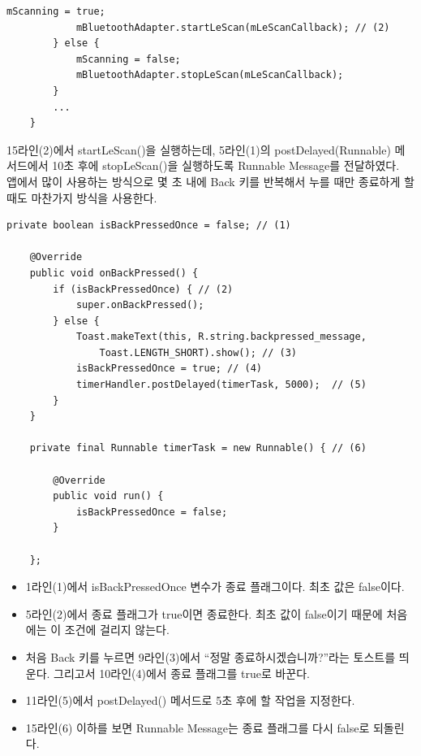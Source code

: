 \begin{itemize}
\begin{lstlisting}[frame=single]
	    	mScanning = true;
	    	mBluetoothAdapter.startLeScan(mLeScanCallback); // (2)
	    } else {
	    	mScanning = false;
	    	mBluetoothAdapter.stopLeScan(mLeScanCallback);
	    }
	    ...
	}
\end{lstlisting}
15라인(2)에서 startLeScan()을 실행하는데, 5라인(1)의 postDelayed(Runnable) 메서드에서 10초 후에 stopLeScan()을 실행하도록 Runnable Message를 전달하였다.\\

앱에서 많이 사용하는 방식으로 몇 초 내에 Back 키를 반복해서 누를 때만 종료하게 할 때도 마찬가지 방식을 사용한다.
\begin{lstlisting}[frame=single] 
	private boolean isBackPressedOnce = false; // (1)
	
	@Override
	public void onBackPressed() {
		if (isBackPressedOnce) { // (2)
			super.onBackPressed();
		} else {
			Toast.makeText(this, R.string.backpressed_message,
				Toast.LENGTH_SHORT).show(); // (3)
			isBackPressedOnce = true; // (4)
			timerHandler.postDelayed(timerTask, 5000);	// (5)		
		}
	}
	
	private final Runnable timerTask = new Runnable() { // (6)
		
		@Override
		public void run() {
			isBackPressedOnce = false;
		}
		
    };
\end{lstlisting}
\begin{itemize}
\item 1라인(1)에서 isBackPressedOnce 변수가 종료 플래그이다. 최초 값은 false이다.

\item 5라인(2)에서 종료 플래그가 true이면 종료한다. 최초 값이 false이기 때문에 처음에는 이 조건에 걸리지 않는다.

\item 처음 Back 키를 누르면 9라인(3)에서 ``정말 종료하시겠습니까?''라는 토스트를 띄운다. 그리고서 10라인(4)에서 종료 플래그를 true로 바꾼다.

\item 11라인(5)에서 postDelayed() 메서드로 5초 후에 할 작업을 지정한다.

\item 15라인(6) 이하를 보면 Runnable Message는 종료 플래그를 다시 false로 되돌린다.
\end{itemize}

\end{itemize}

